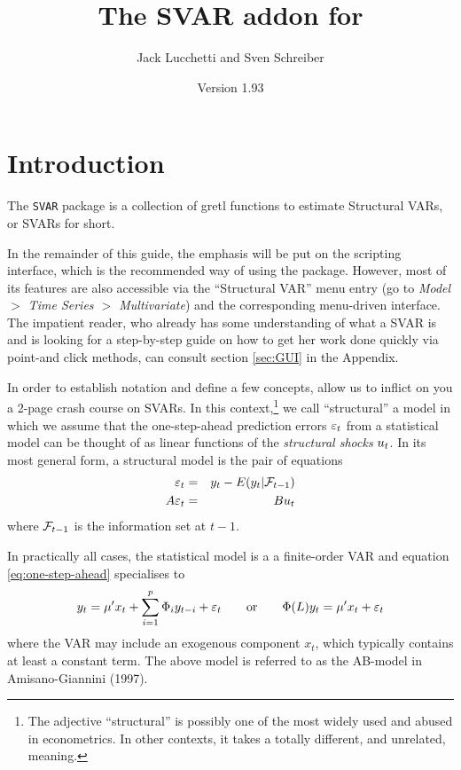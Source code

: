 \documentclass[a4paper,10pt]{article}
\title{The SVAR addon for \app{gretl}}
\author{Jack Lucchetti and Sven Schreiber}
\date{Version 1.93}
\newcommand{\app}[1]{\textsf{#1}}
\newcounter{script}[section]
\newcommand{\PrE}[1]{\ensuremath \varepsilon_{#1}}
\newcommand{\StS}[1]{\ensuremath u_{#1}}
\newcommand{\InfSet}[1]{\ensuremath \mathcal{F}_{#1}}
\newcommand{\VarSym}{\ensuremath \Phi}
\begin{document}
\maketitle



\tableofcontents

\clearpage

\section{Introduction}
\label{sec:intro}

The \texttt{SVAR} package is a collection of \app{gretl} functions to
estimate Structural VARs, or SVARs for short. 

In the remainder of this guide, the emphasis will be put on the
scripting interface, which is the recommended way of using the
package. However, most of its features are also accessible via the
``Structural VAR'' menu entry (go to \emph{Model $>$ Time Series $>$
  Multivariate}) and the corresponding menu-driven interface. The
impatient reader, who already has some understanding of what a SVAR is
and is looking for a step-by-step guide on how to get her work done
quickly via point-and click methods, can consult section \ref{sec:GUI}
in the Appendix.

In order to establish notation and define a few concepts, allow us to
inflict on you a 2-page crash course on SVARs.  In this
context,\footnote{The adjective ``structural'' is possibly one of the
  most widely used and abused in econometrics. In other contexts, it
  takes a totally different, and unrelated, meaning.} we call
``structural'' a model in which we assume that the one-step-ahead
prediction errors $\PrE{t}$ from a statistical model can be thought of
as linear functions of the \emph{structural shocks} $\StS{t}$. In its
most general form, a structural model is the pair of equations
\begin{eqnarray}
  \label{eq:one-step-ahead}
  \PrE{t} & = & y_t - E(y_t | \InfSet{t-1}) \\
  \label{eq:PrE-StS-AB}
  A \PrE{t} & = & B \StS{t}
\end{eqnarray}
where $\InfSet{t-1}$ is the information set at $t-1$.

In practically all cases, the statistical model is a a finite-order
VAR and equation \eqref{eq:one-step-ahead} specialises to
\begin{equation}
  \label{eq:VAR}
  y_t = \mu' x_t + \sum_{i=1}^p \VarSym_i y_{t-i} + \PrE{t}
  \qquad\mathrm{or}\qquad
  \VarSym(L) y_t = \mu' x_t + \PrE{t}
\end{equation}
where the VAR may include an exogenous component $x_t$, which
typically contains at least a constant term. The above model is
referred to as the AB-model in Amisano-Giannini (1997).
\end{document}
